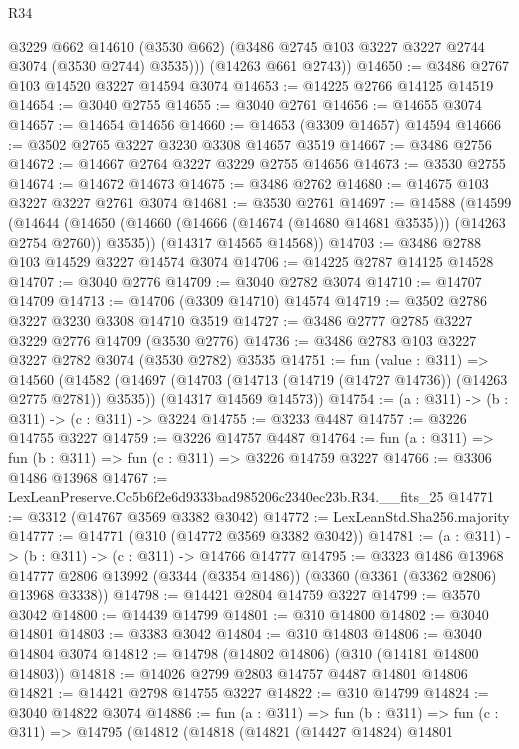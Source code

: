 \begin{lexlean}{R34}
\begin{coremodule}
          @3229
          @662
          @14610
          (@3530 @662)
          (@3486 @2745 @103 @3227 @3227 @2744 @3074 (@3530 @2744) @3535)))
      (@14263 @661 @2743))
@14650 := @3486 @2767 @103 @14520 @3227 @14594 @3074
@14653 := @14225 @2766 @14125 @14519
@14654 := @3040 @2755
@14655 := @3040 @2761
@14656 := @14655 @3074
@14657 := @14654 @14656
@14660 := @14653 (@3309 @14657) @14594
@14666 := @3502 @2765 @3227 @3230 @3308 @14657 @3519
@14667 := @3486 @2756
@14672 := @14667 @2764 @3227 @3229 @2755 @14656
@14673 := @3530 @2755
@14674 := @14672 @14673
@14675 := @3486 @2762
@14680 := @14675 @103 @3227 @3227 @2761 @3074
@14681 := @3530 @2761
@14697 := @14588
    (@14599
      (@14644 (@14650 (@14660 (@14666 (@14674 (@14680 @14681 @3535))) (@14263 @2754 @2760)) @3535))
      (@14317 @14565 @14568))
@14703 := @3486 @2788 @103 @14529 @3227 @14574 @3074
@14706 := @14225 @2787 @14125 @14528
@14707 := @3040 @2776
@14709 := @3040 @2782 @3074
@14710 := @14707 @14709
@14713 := @14706 (@3309 @14710) @14574
@14719 := @3502 @2786 @3227 @3230 @3308 @14710 @3519
@14727 := @3486 @2777 @2785 @3227 @3229 @2776 @14709 (@3530 @2776)
@14736 := @3486 @2783 @103 @3227 @3227 @2782 @3074 (@3530 @2782) @3535
@14751 := fun (value : @311) =>
  @14560
    (@14582
      (@14697 (@14703 (@14713 (@14719 (@14727 @14736)) (@14263 @2775 @2781)) @3535))
      (@14317 @14569 @14573))
@14754 := (a : @311) -> (b : @311) -> (c : @311) -> @3224
@14755 := @3233 @4487
@14757 := @3226 @14755 @3227
@14759 := @3226 @14757 @4487
@14764 := fun (a : @311) => fun (b : @311) => fun (c : @311) => @3226 @14759 @3227
@14766 := @3306 @1486 @13968
@14767 := LexLeanPreserve.Cc5b6f2e6d9333bad985206c2340ec23b.R34.__fits_25
@14771 := @3312 (@14767 @3569 @3382 @3042)
@14772 := LexLeanStd.Sha256.majority
@14777 := @14771 (@310 (@14772 @3569 @3382 @3042))
@14781 := (a : @311) -> (b : @311) -> (c : @311) -> @14766 @14777
@14795 := @3323
    @1486
    @13968
    @14777
    @2806
    @13992
    (@3344 (@3354 @1486))
    (@3360 (@3361 (@3362 @2806) @13968 @3338))
@14798 := @14421 @2804 @14759 @3227
@14799 := @3570 @3042
@14800 := @14439 @14799
@14801 := @310 @14800
@14802 := @3040 @14801
@14803 := @3383 @3042
@14804 := @310 @14803
@14806 := @3040 @14804 @3074
@14812 := @14798 (@14802 @14806) (@310 (@14181 @14800 @14803))
@14818 := @14026 @2799 @2803 @14757 @4487 @14801 @14806
@14821 := @14421 @2798 @14755 @3227
@14822 := @310 @14799
@14824 := @3040 @14822 @3074
@14886 := fun (a : @311) =>
  fun (b : @311) =>
  fun (c : @311) =>
  @14795
    (@14812
      (@14818
        (@14821
          (@14427 @14824)
          @14801

\end{coremodule}
\end{lexlean}
